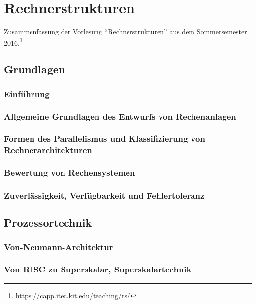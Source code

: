 \chapter{Rechnerstrukturen}

Zusammenfassung der Vorlesung "`Rechnerstrukturen"' aus dem Sommersemester 2016.\footnote{\url{https://capp.itec.kit.edu/teaching/rs/}}

\section{Grundlagen}

\subsection{Einführung}


\subsection{Allgemeine Grundlagen des Entwurfs von Rechenanlagen}


\subsection{Formen des Parallelismus und Klassifizierung von Rechnerarchitekturen}


\subsection{Bewertung von Rechensystemen}


\subsection{Zuverlässigkeit, Verfügbarkeit und Fehlertoleranz}



\section{Prozessortechnik}

\subsection{Von-Neumann-Architektur}


\subsection{Von RISC zu Superskalar, Superskalartechnik}


